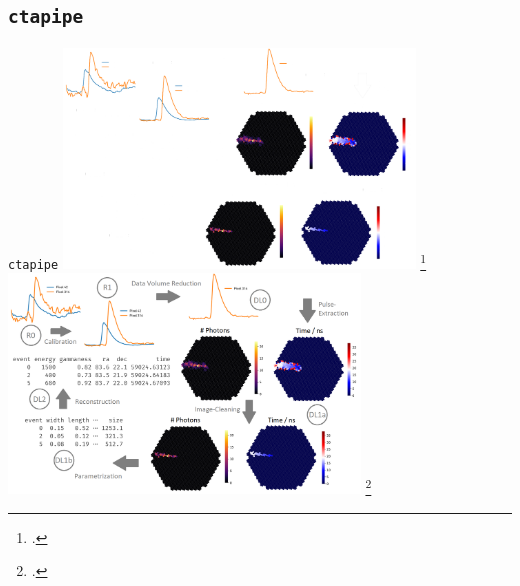 \subsection{\texttt{ctapipe}}
\begin{frame}{\texttt{ctapipe}}
  \centering
  \ifdefined\darktheme
    \includegraphics[width=0.7\textwidth]{graphics/ctapipe_darktheme.png}
    \footcite{hackfeld}
  \else
    \includegraphics[width=0.7\textwidth]{graphics/ctapipe.png}
    \footcite{hackfeld}
  \fi
\end{frame}